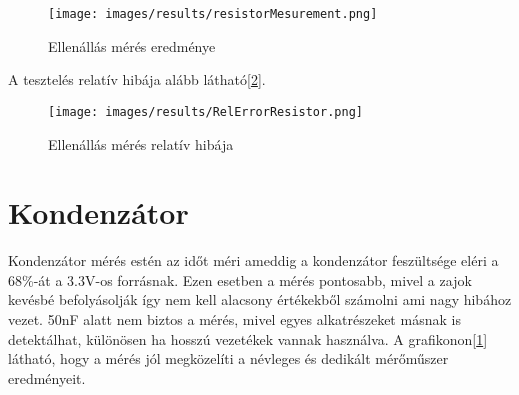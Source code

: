     \begin{figure}[H]
        \centering
        \texttt{[image: images/results/resistorMesurement.png]}
        \caption{Ellenállás mérés eredménye}
        \label{fig:ResistorResults}
    \end{figure}

    A tesztelés relatív hibája alább látható[\ref{fig:ResistorRelErrorResults}].
    \begin{figure}[H]
        \centering
        \texttt{[image: images/results/RelErrorResistor.png]}
        \caption{Ellenállás mérés relatív hibája}
        \label{fig:ResistorRelErrorResults}
    \end{figure}


\section{Kondenzátor}

Kondenzátor mérés estén az időt méri ameddig a kondenzátor feszültsége eléri a 
68\%-át a 3.3V-os forrásnak. Ezen esetben a mérés pontosabb, mivel
a zajok kevésbé befolyásolják így nem kell alacsony értékekből
számolni ami nagy hibához vezet. 50nF alatt nem biztos a mérés, 
mivel egyes alkatrészeket másnak is detektálhat, különösen ha 
hosszú vezetékek vannak használva. A grafikonon[\ref{fig:ResistorResults}]
látható, hogy a mérés jól megközelíti a névleges és dedikált mérőműszer
eredményeit.

